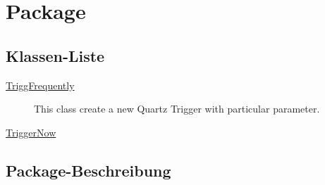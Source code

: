 
\chapter[Package ontologyFramework.OFEventManagement.OFTimeTriggerManagement.OFTimeTriggerImplementation]{Package }\label{ontologyFramework.OFEventManagement.OFTimeTriggerManagement.OFTimeTriggerImplementation-package}



\section{Klassen-Liste}
\begin{description}
\item[{\hyperlink{ontologyFramework.OFEventManagement.OFTimeTriggerManagement.OFTimeTriggerImplementation.TriggFrequently-class}{TriggFrequently}}]
This class create a new Quartz Trigger with particular parameter.
\hfill\pageref{ontologyFramework.OFEventManagement.OFTimeTriggerManagement.OFTimeTriggerImplementation.TriggFrequently-class}

\item[{\hyperlink{ontologyFramework.OFEventManagement.OFTimeTriggerManagement.OFTimeTriggerImplementation.TriggerNow-class}{TriggerNow}}]

\hfill\pageref{ontologyFramework.OFEventManagement.OFTimeTriggerManagement.OFTimeTriggerImplementation.TriggerNow-class}

\end{description}
\section{Package-Beschreibung}



